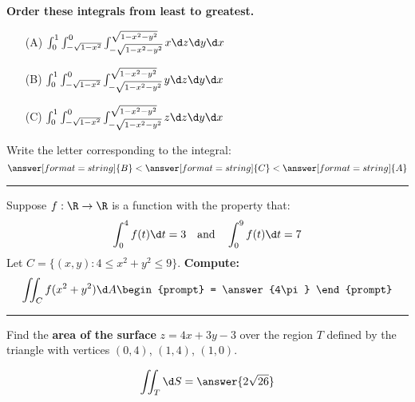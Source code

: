 \documentclass{ximera}
\begin{document}
\begin{problem}
  \textbf{Order these integrals from least to greatest.}
  \begin{enumerate}
  \item[(A)] $\int_0^1 \int_{-\sqrt{1-x^2}}^0\int_{-\sqrt{1-x^2-y^2}}^{\sqrt{1-x^2-y^2}} x \d z \d y \d x$
  \item[(B)] $\int_0^1 \int_{-\sqrt{1-x^2}}^0\int_{-\sqrt{1-x^2-y^2}}^{\sqrt{1-x^2-y^2}} y \d z \d y \d x$
  \item[(C)] $\int_0^1 \int_{-\sqrt{1-x^2}}^0\int_{-\sqrt{1-x^2-y^2}}^{\sqrt{1-x^2-y^2}} z \d z \d y \d x$ 
  \end{enumerate}
  \begin{prompt}
    Write the letter corresponding to the integral:
    \[
    \answer[format=string]{B} < \answer[format=string]{C} < \answer[format=string]{A}
    \]
  \end{prompt}
\end{problem}

\hrule

\begin{problem}
  Suppose $f:\R\to\R$ is a function with the property that:
  \[
  \int_0^4 f(t) \d t = 3 \quad\text{and} \quad \int_0^9 f(t) \d t = 7
  \]
  Let $C = \{(x,y): 4\le x^2+y^2 \le 9\}$. \textbf{Compute:}
  \[
  \iint_C f(x^2 + y^2) \d A
  \begin{prompt}
    = \answer{4\pi}
      \end{prompt}
  \]
  \vfill
\end{problem}

\hrule

\begin{problem}
  Find the \textbf{area of the surface} $z= 4x + 3y -3$ over the region $T$
  defined by the triangle with vertices $(0,4)$, $(1,4)$, $(1,0)$.
  \begin{prompt}
    \[
    \iint_T \d S = \answer{2 \sqrt{26}}
    \]
  \end{prompt}  
\end{problem}
\vfill
\end{document}
